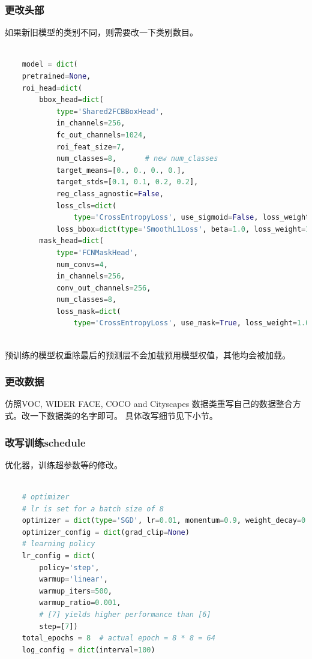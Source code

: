\documentclass[UTF8]{ctexart}
\begin{document}
\subsubsection{更改头部}
如果新旧模型的类别不同，则需要改一下类别数目。

\lstset{style=mystyle}
\begin{lstlisting}[language=Python]

	model = dict(
    pretrained=None,
    roi_head=dict(
        bbox_head=dict(
            type='Shared2FCBBoxHead',
            in_channels=256,
            fc_out_channels=1024,
            roi_feat_size=7,
            num_classes=8,　　　　# new num_classes
            target_means=[0., 0., 0., 0.],
            target_stds=[0.1, 0.1, 0.2, 0.2],
            reg_class_agnostic=False,
            loss_cls=dict(
                type='CrossEntropyLoss', use_sigmoid=False, loss_weight=1.0),
            loss_bbox=dict(type='SmoothL1Loss', beta=1.0, loss_weight=1.0)),
        mask_head=dict(
            type='FCNMaskHead',
            num_convs=4,
            in_channels=256,
            conv_out_channels=256,
            num_classes=8,
            loss_mask=dict(
                type='CrossEntropyLoss', use_mask=True, loss_weight=1.0)))
	
\end{lstlisting}

预训练的模型权重除最后的预测层不会加载预用模型权值，其他均会被加载。

\subsubsection{更改数据}
仿照VOC, WIDER FACE, COCO and Cityscapes 数据类重写自己的数据整合方式。改一下数据类的名字即可。
具体改写细节见下小节。

\subsubsection{改写训练schedule}

优化器，训练超参数等的修改。
\lstset{style=mystyle}
\begin{lstlisting}[language=Python]

	# optimizer
	# lr is set for a batch size of 8
	optimizer = dict(type='SGD', lr=0.01, momentum=0.9, weight_decay=0.0001)
	optimizer_config = dict(grad_clip=None)
	# learning policy
	lr_config = dict(
		policy='step',
		warmup='linear',
		warmup_iters=500,
		warmup_ratio=0.001,
		# [7] yields higher performance than [6]
		step=[7])
	total_epochs = 8  # actual epoch = 8 * 8 = 64
	log_config = dict(interval=100)

\end{lstlisting}
\end{document}
